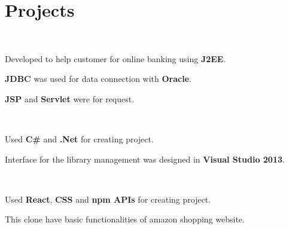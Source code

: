 \documentclass[]{deedy-resume-openfont}
\begin{document}
\hfill
\begin{minipage}[t]{0.66\textwidth} 





\section{Projects}

\\
\sectionsep
\begin{tightemize}
\item Developed to help customer for online banking using \textbf{J2EE}.
\item \textbf{JDBC} was used for data connection with  \textbf{Oracle}.
\item \textbf{JSP} and \textbf{Servlet} were for request.

\end{tightemize}
\sectionsep

\\
\begin{tightemize}
\item Used \textbf{C\#} and \textbf{.Net} for creating project.
\item Interface for the library management was designed in \textbf{Visual Studio 2013}. 
\end{tightemize}
\sectionsep

\\
\begin{tightemize}
\item Used \textbf{React}, \textbf{CSS} and \textbf{npm APIs} for creating project.
\item This clone have basic functionalities of amazon shopping website. 
\end{tightemize}
\sectionsep






\end{minipage}
\end{document}
